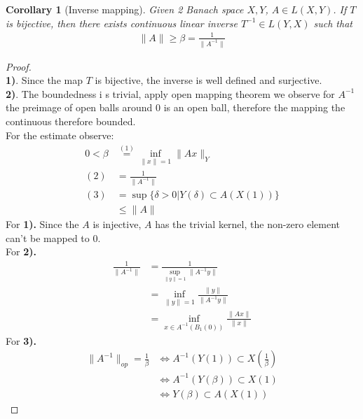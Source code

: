 \documentclass[a4paper,11pt,fleqn]{book}
\newtheorem{corollary}{Corollary}[theorem]
\theoremstyle{definition}
\theoremstyle{remark}
\begin{document}
\begin{corollary}[Inverse mapping]
Given 2 Banach space $X, Y$, $A \in L(X, Y)$. If $T$ is bijective, then there exists continuous linear inverse $T^{-1} \in L(Y, X)$ such that 
\begin{align*}
	\|A\| \ge \beta = \frac{1}{\|A^{-1}\|}
\end{align*}
\end{corollary}
\begin{proof}\quad\\
\textbf{1)}. Since the map $T$ is bijective, the inverse is well defined and surjective.\\
\textbf{2)}. The boundedness i
s trivial, apply open mapping theorem we observe for $A^{-1}$ the preimage of open balls around 0 is an open ball, therefore the mapping the continuous therefore bounded. \\
	For the estimate observe:
	\begin{align*}
		0< \beta &\overset{(1)}{=} \inf_{\|x\| = 1} \| Ax\|_Y \\
	(2)	&= \frac{1}{\|A^{-1}\|} \\
	(3)	&= \sup \{ \delta > 0| Y(\delta) \subset A(X(1))\}\\
		&\le \|A\|
	\end{align*}
	For \textbf{1).} Since the $A$ is injective, $A$ has the trivial kernel, the non-zero element can't be mapped to 0. \\
	For \textbf{2).} 
	\begin{align*}
		\frac{1}{\|A^{-1}\|}
		&=\frac{1}{\sup_{\|y\| = 1} \|A^{-1}y\|} \\
		&= \inf_{\|y \| = 1} \frac{\|y\|}{\|A^{-1}y\|}\\
		&= \inf_{x \in A^{-1}(B_1(0))} \frac{\|Ax\|}{\|x\|}
	\end{align*}
	For \textbf{3).}
	\begin{align*}
		\|A^{-1}\|_{op} = \frac{1}{\beta}
		&\Leftrightarrow A^{-1}(Y(1)) \subset X(\frac{1}{\beta})\\
		&\Leftrightarrow A^{-1}(Y(\beta)) \subset X(1)\\
		&\Leftrightarrow Y(\beta) \subset A(X(1))
	\end{align*}
\end{proof}
\end{document}

